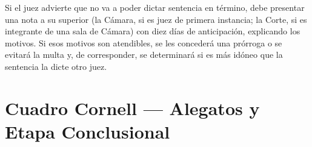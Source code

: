 \documentclass[12pt,oneside]{book}
\begin{document}
Si el juez advierte que no va a poder dictar sentencia en término, debe presentar una nota a su superior (la Cámara, si es juez de primera instancia; la Corte, si es integrante de una sala de Cámara) con diez días de anticipación, explicando los motivos. Si esos motivos son atendibles, se les concederá una prórroga o se evitará la multa y, de corresponder, se determinará si es más idóneo que la sentencia la dicte otro juez.

\section*{Cuadro Cornell --- Alegatos y Etapa Conclusional}
\end{document}
